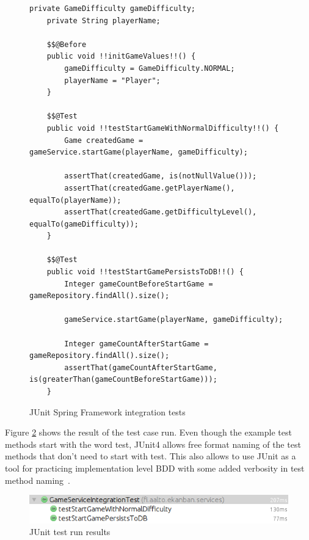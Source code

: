     \begin{figure}[H]
        \begin{lstlisting}[style=java]
    private GameDifficulty gameDifficulty;
    private String playerName;

    $$@Before
    public void !!initGameValues!!() {
        gameDifficulty = GameDifficulty.NORMAL;
        playerName = "Player";
    }

    $$@Test
    public void !!testStartGameWithNormalDifficulty!!() {
        Game createdGame = gameService.startGame(playerName, gameDifficulty);

        assertThat(createdGame, is(notNullValue()));
        assertThat(createdGame.getPlayerName(), equalTo(playerName));
        assertThat(createdGame.getDifficultyLevel(), equalTo(gameDifficulty));
    }

    $$@Test
    public void !!testStartGamePersistsToDB!!() {
        Integer gameCountBeforeStartGame = gameRepository.findAll().size();

        gameService.startGame(playerName, gameDifficulty);

        Integer gameCountAfterStartGame = gameRepository.findAll().size();
        assertThat(gameCountAfterStartGame, is(greaterThan(gameCountBeforeStartGame)));
    }
        \end{lstlisting}
        \caption{JUnit Spring Framework integration tests}
        \label{fig:junit-examples}
    \end{figure}

    Figure \ref{fig:junit-result} shows the result of the test case run. Even though the example test methods start with the word test,
    JUnit4 allows free format naming of the test methods that don't need to start with test. This also allows to use JUnit as a tool for practicing
    implementation level BDD with some added verbosity in test method naming~\cite{smart2014bdd}.

    \begin{figure}[H]
      \begin{center}
        \begin{topbot}[style=mdstyle]
        \includegraphics[width=\textwidth]{images/junit-result.png}
        \end{topbot}
        \caption{JUnit test run results}
        \label{fig:junit-result}
      \end{center}
    \end{figure}

